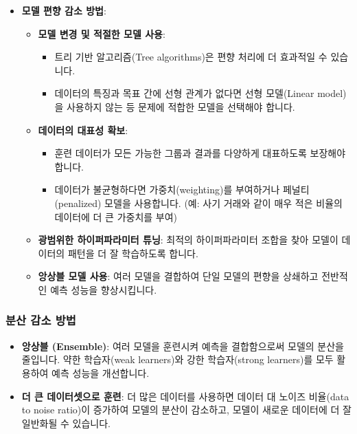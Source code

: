 \documentclass[11pt,a4paper]{article}
\begin{document}
\begin{itemize}
\begin{itemize}
\begin{itemize}
        \item \textbf{모델 편향 감소 방법}:
        \begin{itemize}
            \item \textbf{모델 변경 및 적절한 모델 사용}:
            \begin{itemize}
                \item 트리 기반 알고리즘(Tree algorithms)은 편향 처리에 더 효과적일 수 있습니다.
                \item 데이터의 특징과 목표 간에 선형 관계가 없다면 선형 모델(Linear model)을 사용하지 않는 등 문제에 적합한 모델을 선택해야 합니다.
            \end{itemize}
            \item \textbf{데이터의 대표성 확보}:
            \begin{itemize}
                \item 훈련 데이터가 모든 가능한 그룹과 결과를 다양하게 대표하도록 보장해야 합니다.
                \item 데이터가 불균형하다면 가중치(weighting)를 부여하거나 페널티(penalized) 모델을 사용합니다. (예: 사기 거래와 같이 매우 적은 비율의 데이터에 더 큰 가중치를 부여)
            \end{itemize}
            \item \textbf{광범위한 하이퍼파라미터 튜닝}: 최적의 하이퍼파라미터 조합을 찾아 모델이 데이터의 패턴을 더 잘 학습하도록 합니다.
            \item \textbf{앙상블 모델 사용}: 여러 모델을 결합하여 단일 모델의 편향을 상쇄하고 전반적인 예측 성능을 향상시킵니다.
        \end{itemize}
    \end{itemize}

    \subsubsection*{분산 감소 방법}

    \begin{itemize}
        \item \textbf{앙상블 (Ensemble)}: 여러 모델을 훈련시켜 예측을 결합함으로써 모델의 분산을 줄입니다. 약한 학습자(weak learners)와 강한 학습자(strong learners)를 모두 활용하여 예측 성능을 개선합니다.
        \item \textbf{더 큰 데이터셋으로 훈련}: 더 많은 데이터를 사용하면 데이터 대 노이즈 비율(data to noise ratio)이 증가하여 모델의 분산이 감소하고, 모델이 새로운 데이터에 더 잘 일반화될 수 있습니다.
    \end{itemize}


\end{itemize}
\end{itemize}
\end{document}
